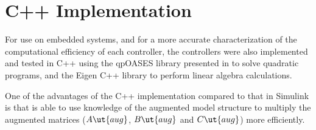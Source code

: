 \section{C++ Implementation}

For use on embedded systems, and for a more accurate characterization of the computational efficiency of each controller, the controllers were also implemented and tested in C++ using the qpOASES library presented in \cite{Ferreau2014} to solve quadratic programs, and the Eigen\cite{Eigen} C++ library to perform linear algebra calculations.


One of the advantages of the C++ implementation compared to that in Simulink is that is able to use knowledge of the augmented model structure to multiply the augmented matrices ($A\ut{aug}$, $B\ut{aug}$ and $C\ut{aug}$) more efficiently.


